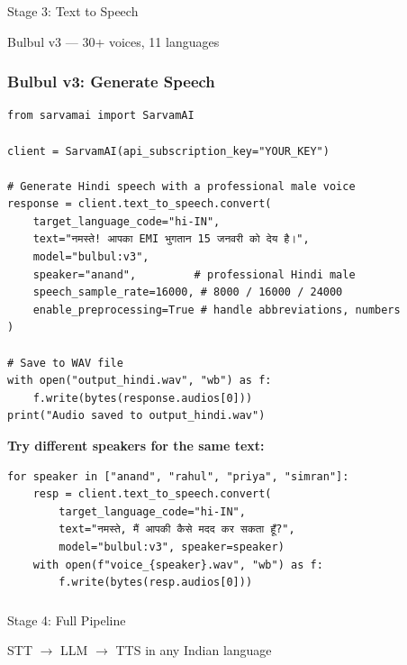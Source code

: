 \begin{frame}[fragile]\frametitle{}
\begin{center}
{\Large Stage 3: Text to Speech}

{\normalsize Bulbul v3 --- 30+ voices, 11 languages}
\end{center}
\end{frame}

\begin{frame}[fragile]\frametitle{Bulbul v3: Generate Speech}
\begin{lstlisting}
from sarvamai import SarvamAI

client = SarvamAI(api_subscription_key="YOUR_KEY")

# Generate Hindi speech with a professional male voice
response = client.text_to_speech.convert(
    target_language_code="hi-IN",
    text="नमस्ते! आपका EMI भुगतान 15 जनवरी को देय है।",
    model="bulbul:v3",
    speaker="anand",         # professional Hindi male
    speech_sample_rate=16000, # 8000 / 16000 / 24000
    enable_preprocessing=True # handle abbreviations, numbers
)

# Save to WAV file
with open("output_hindi.wav", "wb") as f:
    f.write(bytes(response.audios[0]))
print("Audio saved to output_hindi.wav")
\end{lstlisting}

\textbf{Try different speakers for the same text:}
\begin{lstlisting}
for speaker in ["anand", "rahul", "priya", "simran"]:
    resp = client.text_to_speech.convert(
        target_language_code="hi-IN",
        text="नमस्ते, मैं आपकी कैसे मदद कर सकता हूँ?",
        model="bulbul:v3", speaker=speaker)
    with open(f"voice_{speaker}.wav", "wb") as f:
        f.write(bytes(resp.audios[0]))
\end{lstlisting}
\end{frame}


\begin{frame}[fragile]\frametitle{}
\begin{center}
{\Large Stage 4: Full Pipeline}

{\normalsize STT $\to$ LLM $\to$ TTS in any Indian language}
\end{center}
\end{frame}

